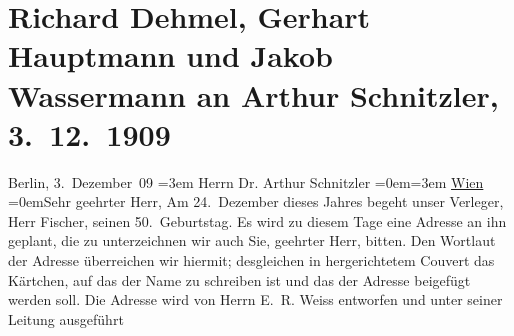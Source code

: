 

         
         \renewcommand{\erwaehntePersonen}{Personen: Richard Dehmel, Samuel Fischer, Gerhart Hauptmann, Jakob Wassermann, Emil Rudolf Weiß}
         \renewcommand{\erwaehnteOrte}{Orte: Berlin, Deutschland, Wien}
         \renewcommand{\erwaehnteWerke}{}
               \section[Richard Dehmel, Gerhart Hauptmann und Jakob Wassermann an Arthur Schnitzler, 3. 12. 1909]{ Richard Dehmel, Gerhart Hauptmann und Jakob Wassermann an Arthur
               Schnitzler, 3. 12. 1909}\nopagebreak{}\rehead{ }\begin{ledgroupsized}[t]{13cm}\normalsize\beginnumbering \toendnotes[C]{\smallbreak\pagebreak[2]} 
\pstart
           \raggedleft{}{\pb}Berlin, 3. Dezember 09\pend
           \leftskip=3em{}\pstart
           \noindent{}Herrn Dr. Arthur Schnitzler\pend
           \leftskip=0em{}\leftskip=3em{}\pstart
           \uline{Wien}\pend
           \leftskip=0em{}\pstart{}Sehr geehrter Herr,\pend\pstart
           Am 24. Dezember dieses Jahres begeht unser Verleger, Herr Fischer, seinen 50. Geburtstag. Es wird zu
               diesem Tage eine Adresse an ihn geplant, die zu unterzeichnen wir auch Sie, geehrter
               Herr, bitten. Den Wortlaut der Adresse überreichen wir hiermit; desgleichen in
               hergerichtetem Couvert das Kärtchen, auf das der Name zu schreiben ist und das der
               Adresse beigefügt werden soll. Die Adresse wird von Herrn E. R. Weiss entworfen und unter seiner Leitung ausgeführt

\end{ledgroupsized}
